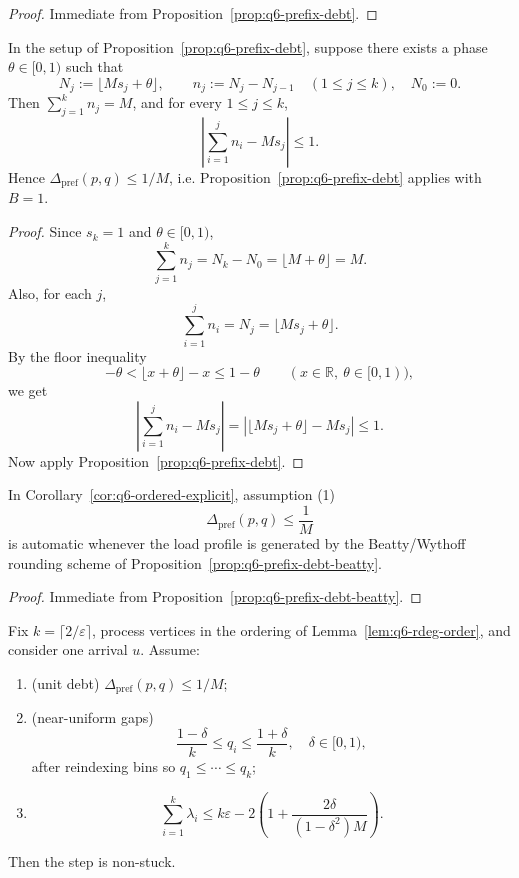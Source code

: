 \begin{proof}
Immediate from Proposition~\ref{prop:q6-prefix-debt}.
\end{proof}

\begin{proposition}
\label{prop:q6-prefix-debt-beatty}
In the setup of Proposition~\ref{prop:q6-prefix-debt}, suppose there
exists a phase \(\theta\in[0,1)\) such that
\[
N_j:=\bigl\lfloor M s_j+\theta\bigr\rfloor,\qquad
n_j:=N_j-N_{j-1}\quad (1\le j\le k),\quad N_0:=0.
\]
Then \(\sum_{j=1}^k n_j=M\), and for every \(1\le j\le k\),
\[
\left|\sum_{i=1}^j n_i - M s_j\right|\le 1.
\]
Hence \(\Delta_{\mathrm{pref}}(p,q)\le 1/M\), i.e.
Proposition~\ref{prop:q6-prefix-debt} applies with \(B=1\).
\end{proposition}

\begin{proof}
Since \(s_k=1\) and \(\theta\in[0,1)\),
\[
\sum_{j=1}^k n_j
=N_k-N_0
=\lfloor M+\theta\rfloor
=M.
\]
Also, for each \(j\),
\[
\sum_{i=1}^j n_i
=N_j
=\lfloor M s_j+\theta\rfloor.
\]
By the floor inequality
\[
-\theta<\lfloor x+\theta\rfloor-x\le 1-\theta
\qquad (x\in\mathbb R,\ \theta\in[0,1)),
\]
we get
\[
\left|\sum_{i=1}^j n_i-M s_j\right|
=\left|\lfloor M s_j+\theta\rfloor-M s_j\right|
\le 1.
\]
Now apply Proposition~\ref{prop:q6-prefix-debt}.
\end{proof}

\begin{corollary}
\label{cor:q6-ordered-explicit-beatty}
In Corollary~\ref{cor:q6-ordered-explicit}, assumption (1)
\[
\Delta_{\mathrm{pref}}(p,q)\le \frac1M
\]
is automatic whenever the load profile is generated by the
Beatty/Wythoff rounding scheme of
Proposition~\ref{prop:q6-prefix-debt-beatty}.
\end{corollary}

\begin{proof}
Immediate from Proposition~\ref{prop:q6-prefix-debt-beatty}.
\end{proof}

\begin{corollary}\label{cor:q6-ordered-explicit}
Fix \(k=\lceil 2/\varepsilon\rceil\), process vertices in the ordering of
Lemma~\ref{lem:q6-rdeg-order}, and consider one arrival \(u\).
Assume:
\begin{enumerate}[nosep]
\item (unit debt) \(\Delta_{\mathrm{pref}}(p,q)\le 1/M\);
\item (near-uniform gaps)
\[
\frac{1-\delta}{k}\le q_i\le \frac{1+\delta}{k},
\quad \delta\in[0,1),
\]
after reindexing bins so \(q_1\le\cdots\le q_k\);
\item
\[
\sum_{i=1}^k \lambda_i
\le
k\varepsilon
-2\left(1+\frac{2\delta}{(1-\delta^2)M}\right).
\]
\end{enumerate}
Then the step is non-stuck.
\end{corollary}

